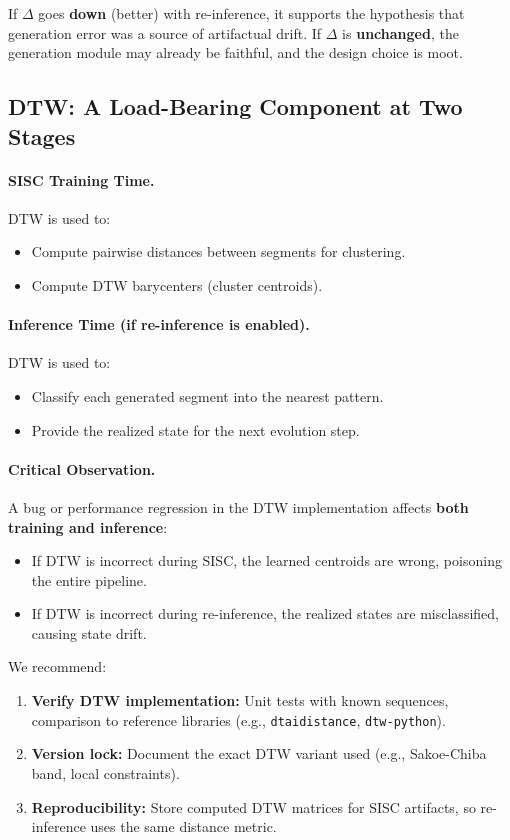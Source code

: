 If $\Delta$ goes \textbf{down} (better) with re-inference, it supports the hypothesis that generation error was a source of artifactual drift.
If $\Delta$ is \textbf{unchanged}, the generation module may already be faithful, and the design choice is moot.

\subsection{DTW: A Load-Bearing Component at Two Stages}

\paragraph{SISC Training Time.} DTW is used to:
\begin{itemize}[leftmargin=*,topsep=2pt,itemsep=2pt]
  \item Compute pairwise distances between segments for clustering.
  \item Compute DTW barycenters (cluster centroids).
\end{itemize}

\paragraph{Inference Time (if re-inference is enabled).} DTW is used to:
\begin{itemize}[leftmargin=*,topsep=2pt,itemsep=2pt]
  \item Classify each generated segment into the nearest pattern.
  \item Provide the realized state for the next evolution step.
\end{itemize}

\paragraph{Critical Observation.} A bug or performance regression in the DTW implementation affects \textbf{both training and inference}:
\begin{itemize}[leftmargin=*,topsep=2pt,itemsep=2pt]
  \item If DTW is incorrect during SISC, the learned centroids are wrong, poisoning the entire pipeline.
  \item If DTW is incorrect during re-inference, the realized states are misclassified, causing state drift.
\end{itemize}

We recommend:
\begin{enumerate}[leftmargin=*,topsep=2pt,itemsep=2pt]
  \item \textbf{Verify DTW implementation:} Unit tests with known sequences, comparison to reference libraries (e.g., \texttt{dtaidistance}, \texttt{dtw-python}).
  \item \textbf{Version lock:} Document the exact DTW variant used (e.g., Sakoe-Chiba band, local constraints).
  \item \textbf{Reproducibility:} Store computed DTW matrices for SISC artifacts, so re-inference uses the same distance metric.
\end{enumerate}


